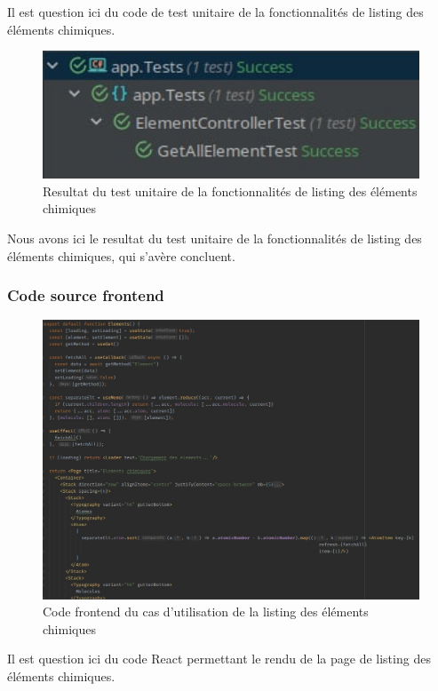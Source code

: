 Il est question ici du code de test unitaire de la fonctionnalités de listing des éléments chimiques.

\begin{figure}[H]
	\centering
	\includegraphics[width=1\textwidth]{img/utetlist}
	\caption{Resultat du test unitaire de la fonctionnalités de listing des éléments chimiques}
\end{figure}

Nous avons ici le resultat du test unitaire de la fonctionnalités de listing des éléments chimiques, qui s'avère concluent.

\subsubsection{Code source frontend}

\begin{figure}[H]
	\centering
	\includegraphics[width=1\textwidth]{img/fetl}
	\caption{Code frontend du cas d'utilisation de la listing des éléments chimiques}
\end{figure}

Il est question ici du code React permettant le rendu de la page de listing des éléments chimiques.

